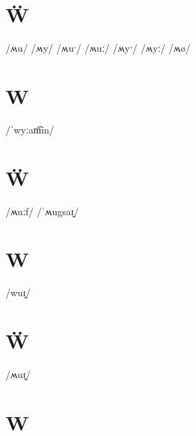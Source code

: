 \documentclass[10pt,a4paper,twoside]{book}
\begin{document}
\section*{Ẅ}

\begin{multicols}{3}
 {/ʍu/} {}
 {/ʍy/} {}
 {/ʍuˑ/} {}
 {/ʍuː/} {}
 {/ʍyˑ/} {}
 {/ʍyː/} {}
 {/ʍø/} {}
\end{multicols}

\section*{W}

\begin{multicols}{3}
 {/ˈwyːam͡m/} {}
\end{multicols}

\section*{Ẅ}

\begin{multicols}{3}
 {/ʍuːf/} {}
 {/ˈʍugsaɪ̯/} {}
\end{multicols}

\section*{W}

\begin{multicols}{3}
 {/wuɪ̯/} {}
\end{multicols}

\section*{Ẅ}

\begin{multicols}{3}
 {/ʍuɪ̯/} {}
\end{multicols}

\section*{W}
\end{document}
